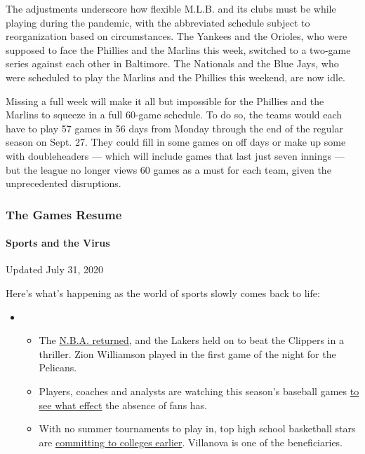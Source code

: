 The adjustments underscore how flexible M.L.B. and its clubs must be
while playing during the pandemic, with the abbreviated schedule subject
to reorganization based on circumstances. The Yankees and the Orioles,
who were supposed to face the Phillies and the Marlins this week,
switched to a two-game series against each other in Baltimore. The
Nationals and the Blue Jays, who were scheduled to play the Marlins and
the Phillies this weekend, are now idle.

Missing a full week will make it all but impossible for the Phillies and
the Marlins to squeeze in a full 60-game schedule. To do so, the teams
would each have to play 57 games in 56 days from Monday through the end
of the regular season on Sept. 27. They could fill in some games on off
days or make up some with doubleheaders --- which will include games
that last just seven innings --- but the league no longer views 60 games
as a must for each team, given the unprecedented disruptions.

\hypertarget{the-games-resume}{%
\subsubsection{The Games Resume}\label{the-games-resume}}

\hypertarget{sports-and-the-virus}{%
\paragraph{Sports and the Virus}\label{sports-and-the-virus}}

Updated July 31, 2020

Here's what's happening as the world of sports slowly comes back to
life:

\begin{itemize}
\item
  \begin{itemize}
  \tightlist
  \item
    The
    \href{https://www.nytimes.com/2020/07/30/sports/basketball/clippers-lakers.html?action=click\&pgtype=Article\&state=default\&region=MAIN_CONTENT_2\&context=storylines_keepup}{N.B.A.
    returned}, and the Lakers held on to beat the Clippers in a
    thriller. Zion Williamson played in the first game of the night for
    the Pelicans.
  \item
    Players, coaches and analysts are watching this season's baseball
    games
    \href{https://www.nytimes.com/2020/07/31/sports/baseball/baseball-empty-stadiums-effects.html?action=click\&pgtype=Article\&state=default\&region=MAIN_CONTENT_2\&context=storylines_keepup}{to
    see what effect} the absence of fans has.
  \item
    With no summer tournaments to play in, top high school basketball
    stars are
    \href{https://www.nytimes.com/2020/07/30/sports/ncaabasketball/college-basketball-recruiting.html?action=click\&pgtype=Article\&state=default\&region=MAIN_CONTENT_2\&context=storylines_keepup}{committing
    to colleges earlier}. Villanova is one of the beneficiaries.
  \end{itemize}
\end{itemize}

